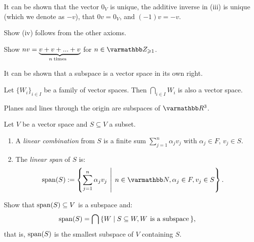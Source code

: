     It can be shown that the vector $0_V$ is unique, the additive inverse in (iii) is unique (which we denote as $-v$), that $0v = 0_V$, and $(-1)v = -v$.

    \begin{exercise}
        Show (iv) follows from the other axioms.
    \end{exercise}

    \begin{exercise}
        Show $nv = \underbrace{v + v + ... + v}_{n \hspace{-4pt}\mtext{times}}$ for $n \in \bfZ_{\geq 1}$.
    \end{exercise}

    It can be shown that a subspace is a vector space in its own right.

    \begin{example}
        Let $\{W_i\}_{i \in I}$ be a family of vector spaces. Then $\bigcap_{i \in I}W_i$ is also a vector space.
    \end{example}

    \begin{example}
        Planes and lines through the origin are subspaces of $\bfR^3$.
    \end{example}

    \begin{definition}
        Let $V$ be a vector space and $S \subseteq V$ a subset.
            \begin{enumerate}[label = (\arabic*),itemsep=1pt,topsep=3pt]
                \item A \textit{linear combination} from $S$ is a finite sum $\sum_{j = 1}^n \alpha_j v_j$ with $\alpha_j \in F$, $v_j \in S$.
                \item The \textit{linear span} of $S$ is:
                    \begin{equation*}
                    \begin{split}
                        \Span(S) := \left\{ \sum_{j = 1}^n \alpha_j v_j \hspace{4pt}\middle|\hspace{4pt} n \in \bfN, \alpha_j \in F, v_j \in S \right\}.
                    \end{split}
                    \end{equation*}
            \end{enumerate}
    \end{definition}

    \begin{exercise}
        Show that $\operatorname{span}(S) \subseteq V$ is a subspace and:
            \begin{equation*}
            \begin{split}
                \Span(S) = \bigcap \hspace{2pt}\{W \mid S \subseteq W, W \hspace{-2pt}\mtext{is a subspace}\hspace{-4pt}\},
            \end{split}
            \end{equation*}
        that is, $\operatorname{span}(S)$ is the smallest subspace of $V$ containing $S$.
    \end{exercise}


